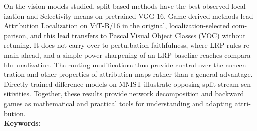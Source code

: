 \begin{otherlanguage}{english}
On the vision models studied, split-based methods have the best observed localization and Selectivity means on pretrained VGG-16. Game-derived methods lead Attribution Localization on ViT-B/16 in the original, localization-selected comparison, and this lead transfers to Pascal Visual Object Classes (VOC) without retuning. It does not carry over to perturbation faithfulness, where LRP rules remain ahead, and a simple power sharpening of an LRP baseline reaches comparable localization. The routing modifications thus provide control over the concentration and other properties of attribution maps rather than a general advantage. Directly trained difference models on MNIST illustrate opposing split-stream sensitivities. Together, these results provide network decomposition and backward games as mathematical and practical tools for understanding and adapting attribution.
\\[2ex]
\textbf{Keywords:} \itshape \englishkeywords
\end{otherlanguage}

